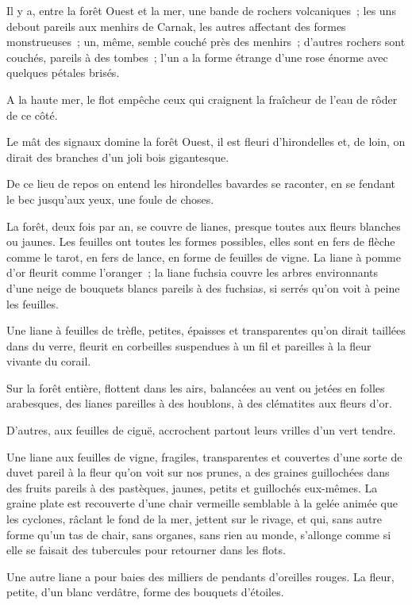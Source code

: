 \documentclass[french,twoside]{book} %
\newcommand\chaptercont{} %
\begin{document}
\chaptercont
\noindent Il y a, entre la forêt Ouest et la mer, une bande de rochers volcaniques ; les uns debout pareils aux menhirs de Carnak, les autres affectant des formes monstrueuses ; un, même, semble couché près des menhirs ; d’autres rochers sont couchés, pareils à des tombes ; l’un a la forme étrange d’une rose énorme avec quelques pétales brisés.\par
A la haute mer, le flot empêche ceux qui craignent la fraîcheur de l’eau de rôder de ce côté.\par
Le mât des signaux domine la forêt Ouest, il est fleuri d’hirondelles et, de loin, on dirait des branches d’un joli bois gigantesque.\par
De ce lieu de repos on entend les hirondelles bavardes se raconter, en se fendant le bec jusqu’aux yeux, une foule de choses.\par
La forêt, deux fois par an, se couvre de lianes, presque toutes aux fleurs blanches ou jaunes. Les feuilles ont toutes les formes possibles, elles sont en fers de flèche comme le tarot, en fers de  lance, en forme de feuilles de vigne. La liane à pomme d’or fleurit comme l’oranger ; la liane fuchsia couvre les arbres environnants d’une neige de bouquets blancs pareils à des fuchsias, si serrés qu’on voit à peine les feuilles.\par
Une liane à feuilles de trèfle, petites, épaisses et transparentes qu’on dirait taillées dans du verre, fleurit en corbeilles suspendues à un fil et pareilles à la fleur vivante du corail.\par
Sur la forêt entière, flottent dans les airs, balancées au vent ou jetées en folles arabesques, des lianes pareilles à des houblons, à des clématites aux fleurs d’or.\par
D’autres, aux feuilles de ciguë, accrochent partout leurs vrilles d’un vert tendre.\par
Une liane aux feuilles de vigne, fragiles, transparentes et couvertes d’une sorte de duvet pareil à la fleur qu’on voit sur nos prunes, a des graines guillochées dans des fruits pareils à des pastèques, jaunes, petits et guillochés eux-mêmes. La graine plate est recouverte d’une chair vermeille semblable à la gelée animée que les cyclones, râclant le fond de la mer, jettent sur le rivage, et qui, sans autre forme qu’un tas de chair, sans organes, sans rien au monde, s’allonge comme si elle se faisait des tubercules pour retourner dans les flots.\par
 Une autre liane a pour baies des milliers de pendants d’oreilles rouges. La fleur, petite, d’un blanc verdâtre, forme des bouquets d’étoiles.\par
\end{document}
